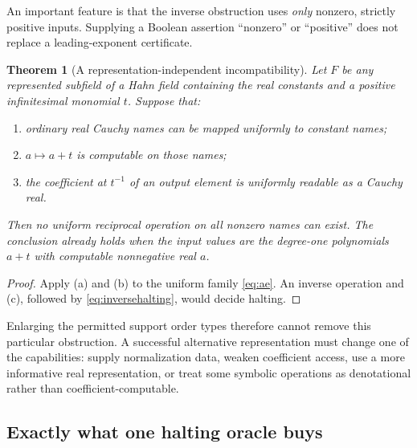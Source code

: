 \documentclass[11pt,letterpaper]{article}
\numberwithin{equation}{section}
\newtheorem{theorem}{Theorem}[section]
\theoremstyle{definition}
\theoremstyle{remark}
\begin{document}
An important feature is that the inverse obstruction uses \emph{only}
nonzero, strictly positive inputs. Supplying a Boolean assertion
``nonzero'' or ``positive'' does not replace a leading-exponent certificate.

\begin{theorem}[A representation-independent incompatibility]
\label{thm:nogo}
Let $F$ be any represented subfield of a Hahn field containing the real
constants and a positive infinitesimal monomial $t$. Suppose that:
\begin{enumerate}[label=\textup{(\alph*)},leftmargin=2em]
\item ordinary real Cauchy names can be mapped uniformly to constant names;
\item $a\mapsto a+t$ is computable on those names;
\item the coefficient at $t^{-1}$ of an output element is uniformly
readable as a Cauchy real.
\end{enumerate}
Then no uniform reciprocal operation on all nonzero names can exist.
The conclusion already holds when the input values are the degree-one
polynomials $a+t$ with computable nonnegative real $a$.
\end{theorem}
\begin{proof}
Apply (a) and (b) to the uniform family \eqref{eq:ae}. An inverse operation
and (c), followed by \eqref{eq:inversehalting}, would decide halting.
\end{proof}

Enlarging the permitted support order types therefore cannot remove this
particular obstruction. A successful alternative representation must change
one of the capabilities: supply normalization data, weaken coefficient
access, use a more informative real representation, or treat some symbolic
operations as denotational rather than coefficient-computable.

\subsection{Exactly what one halting oracle buys}
\end{document}
